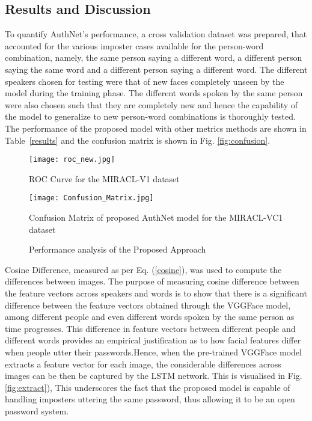 \documentclass[letterpaper]{article}
\begin{document}
\subsection{Results and Discussion}
To quantify AuthNet's performance, a cross validation dataset was prepared, that accounted for the various imposter cases available for the person-word combination, namely, the  same person saying a different word, a different person saying the same word and a different person saying a different word. The different speakers chosen for testing were that of new faces completely unseen by the model during the training phase. The different words spoken by the same person were also chosen such that they are completely new and hence the capability of the model to generalize to new person-word combinations is thoroughly tested. The performance of the proposed model with other metrics methods are shown in Table~\ref{results} and the confusion matrix is shown in Fig. \ref{fig:confusion}. 

\begin{figure}[h!]
\centering
  \texttt{[image: roc\_new.jpg]}
  \caption{ROC Curve for the MIRACL-V1 dataset}
  \label{fig:ROC}
\end{figure}
\begin{figure}[h!]
  \centering
    \texttt{[image: Confusion\_Matrix.jpg]}
    \caption{Confusion Matrix of proposed AuthNet model for the MIRACL-VC1 dataset}
    \label{fig:confusion}
\caption{Performance analysis of the Proposed Approach}
\label{fig:test}
\end{figure}

Cosine Difference, measured as per Eq. (\ref{cosine}), was used to compute the differences between images. 
The purpose of measuring cosine difference between the feature vectors across speakers and words is to show that there is a significant difference between the feature vectors obtained through the VGGFace model, among different people and even different words spoken by the same person as time progresses. This difference in feature vectors between different people and different words provides an empirical justification as to how facial features differ when people utter their passwords.Hence, when the pre-trained VGGFace model extracts a feature vector for each image, the considerable differences across images can be then be captured by the LSTM network. This is visualised in Fig. \ref{fig:extract}), This underscores the fact that the proposed model is capable of handling imposters uttering the same password, thus allowing it to be an open password system.
\end{document}
